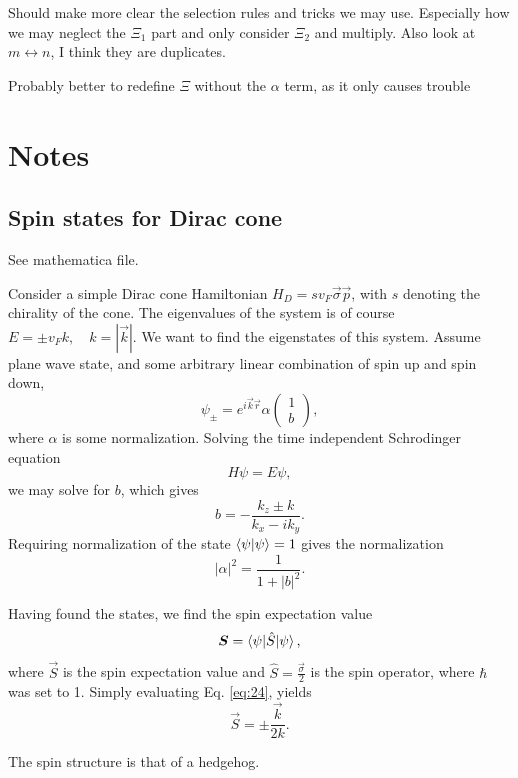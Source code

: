 Should make more clear the selection rules and tricks we may use.
Especially how we may neglect the \( \Xi _1 \) part and only consider \( \Xi _2 \) and multiply.
Also look at \( m \leftrightarrow n \), I think they are duplicates.

Probably better to redefine \( \Xi  \) without the \( \alpha  \) term, as it only causes trouble

\section{Notes}
\subsection{Spin states for Dirac cone}
See mathematica file.

Consider a simple Dirac cone Hamiltonian \(H_{D} = s v_{F} \vec{\sigma} \vec{p}\), with \(s\) denoting the chirality of the cone.
The eigenvalues of the system is of course \(E = \pm v_{F} k, \quad k=|\vec{k}|\).
We want to find the eigenstates of this system.
Assume plane wave state, and some arbitrary linear combination of spin up and spin down,
\[
  \psi _{\pm} = e^{i \vec{k} \vec{r}} \alpha
  \begin{pmatrix}
    1\\
    b
  \end{pmatrix},
\]
where \(\alpha \) is some normalization.
Solving the time independent Schrodinger equation
\[
H \psi = E \psi,
\]
we may solve for \(b\), which gives
\begin{equation}
  \label{eq:23}
  b = -\frac{k_{z} \pm k}{k_{x} - i k_{y}}.
\end{equation}
Requiring normalization of the state \(\braket{\psi | \psi } = 1\) gives the normalization
\[
|\alpha |^2 = \frac{1}{1 + |b|^2}.
\]

Having found the states, we find the spin expectation value
\begin{equation}
  \label{eq:24}
  \bm{S} = \braket{\psi | \hat{S} | \psi },
\end{equation}
where \(\vec{S}\) is the spin expectation value and \(\hat{S} = \frac{\vec{\sigma}}{2} \) is the spin operator, where \(\hbar \) was set to 1.
Simply evaluating Eq. \eqref{eq:24}, yields
\begin{equation}
  \label{eq:25}
  \vec{S} = \pm \frac{\vec{k}}{2 k}.
\end{equation}

The spin structure is that of a hedgehog.

